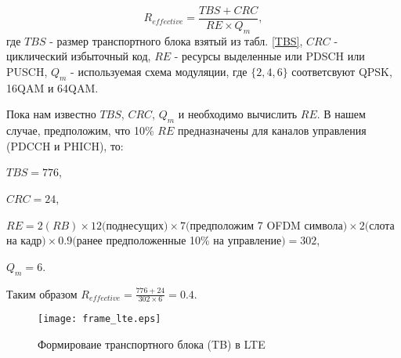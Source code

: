 \begin{equation}\label{eq:Reffective}
R_{effective}=\frac{TBS+CRC}{RE \times Q_{m}},
\end{equation}
\noindent где $TBS$ - размер транспортного блока взятый из табл. \ref{TBS}, $CRC$ - циклический избыточный код, $RE$ - ресурсы выделенные или PDSCH или PUSCH, $Q_{m}$ - используемая  схема модуляции, где $\{2,4,6\}$ соответсвуют QPSK, 16QAM и 64QAM.

Пока нам известно $TBS$, $CRC$, $Q_{m}$ и необходимо вычислить $RE$. В нашем случае, предположим, что 10\% $RE$ предназначены для каналов управления (PDCCH и PHICH), то:

$TBS=776$,

$CRC=24$,

$RE=2(RB) \times 12($поднесущих$) \times 7 ($предположим 7 OFDM символа$) \times 2 ($слота на кадр$) \times 0.9 ($ранее предположенные 10\% на управление$)= 302$,

$Q_{m}=6$.

Таким образом $R_{effective}=\frac{776+24}{302 \times 6}=0.4$.

\begin{figure} [h]
  \center
\texttt{[image: frame\_lte.eps]}
  \caption{Формироваие транспортного блока (TB) в LTE}
  \label{img:frame_lte}
\end{figure}





\clearpage

